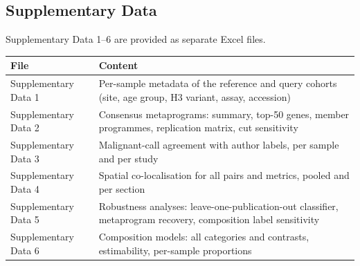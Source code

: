 \documentclass[11pt,a4paper]{article}
\begin{document}
\subsection{Supplementary Data}
\noindent Supplementary Data 1--6 are provided as separate Excel files.

\medskip
\begin{tabular}{@{}l>{\raggedright\arraybackslash}p{11.4cm}@{}}
\toprule
File & Content \\
\midrule
Supplementary Data 1 & Per-sample metadata of the reference and query cohorts (site, age group, H3 variant, assay, accession) \\
Supplementary Data 2 & Consensus metaprograms: summary, top-50 genes, member programmes, replication matrix, cut sensitivity \\
Supplementary Data 3 & Malignant-call agreement with author labels, per sample and per study \\
Supplementary Data 4 & Spatial co-localisation for all pairs and metrics, pooled and per section \\
Supplementary Data 5 & Robustness analyses: leave-one-publication-out classifier, metaprogram recovery, composition label sensitivity \\
Supplementary Data 6 & Composition models: all categories and contrasts, estimability, per-sample proportions \\
\bottomrule
\end{tabular}
\end{document}
